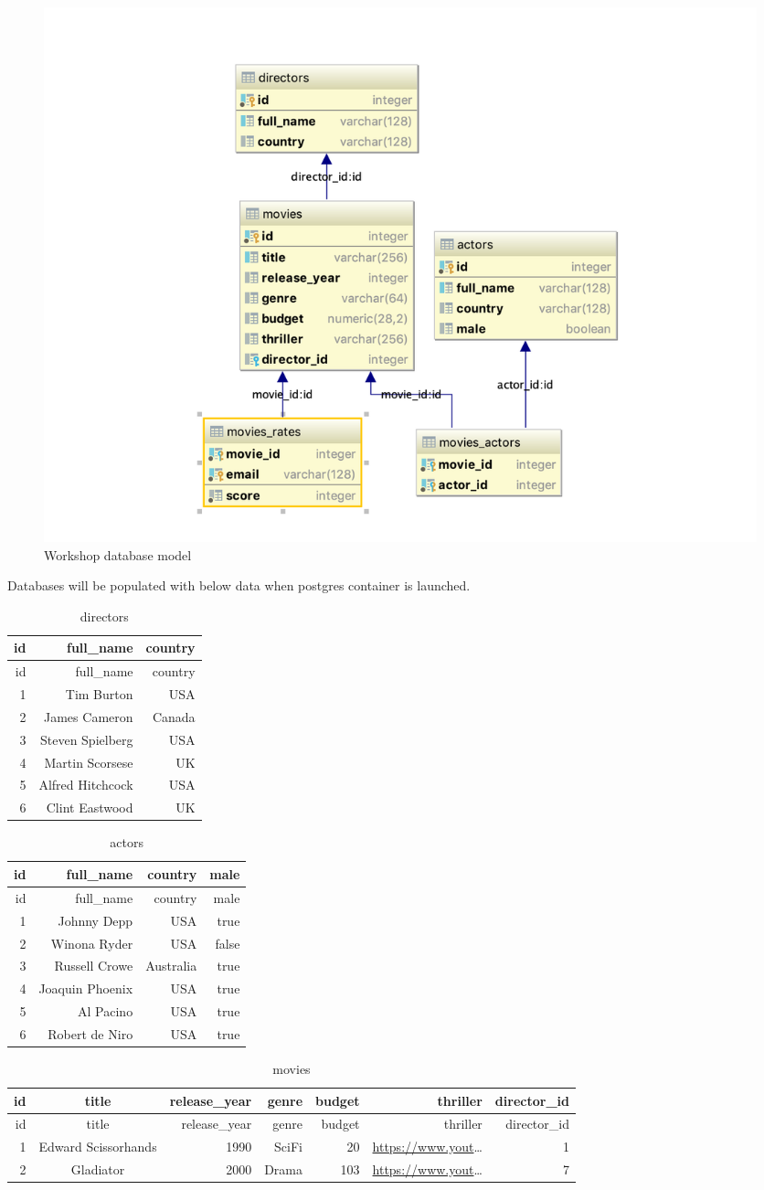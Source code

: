 \documentclass[]{book}
\begin{document}
\begin{figure}
\centering
\includegraphics{assets/database-model.png}
\caption{Workshop database model}
\end{figure}

Databases will be populated with below data when postgres container is
launched.

\begin{longtable}[]{@{}rrr@{}}
\caption{directors}\tabularnewline
\toprule
id & full\_name & country\tabularnewline
\midrule
\endfirsthead
\toprule
id & full\_name & country\tabularnewline
\midrule
\endhead
1 & Tim Burton & USA\tabularnewline
2 & James Cameron & Canada\tabularnewline
3 & Steven Spielberg & USA\tabularnewline
4 & Martin Scorsese & UK\tabularnewline
5 & Alfred Hitchcock & USA\tabularnewline
6 & Clint Eastwood & UK\tabularnewline
\bottomrule
\end{longtable}

\begin{longtable}[]{@{}rrrr@{}}
\caption{actors}\tabularnewline
\toprule
id & full\_name & country & male\tabularnewline
\midrule
\endfirsthead
\toprule
id & full\_name & country & male\tabularnewline
\midrule
\endhead
1 & Johnny Depp & USA & true\tabularnewline
2 & Winona Ryder & USA & false\tabularnewline
3 & Russell Crowe & Australia & true\tabularnewline
4 & Joaquin Phoenix & USA & true\tabularnewline
5 & Al Pacino & USA & true\tabularnewline
6 & Robert de Niro & USA & true\tabularnewline
\bottomrule
\end{longtable}

\begin{longtable}[]{@{}rcrrrrr@{}}
\caption{movies}\tabularnewline
\toprule
id & title & release\_year & genre & budget & thriller &
director\_id\tabularnewline
\midrule
\endfirsthead
\toprule
id & title & release\_year & genre & budget & thriller &
director\_id\tabularnewline
\midrule
\endhead
1 & Edward Scissorhands & 1990 & SciFi & 20 &
\url{https://www.yout}\ldots{} & 1\tabularnewline
2 & Gladiator & 2000 & Drama & 103 & \url{https://www.yout}\ldots{} &
7\tabularnewline
\bottomrule
\end{longtable}
\end{document}
